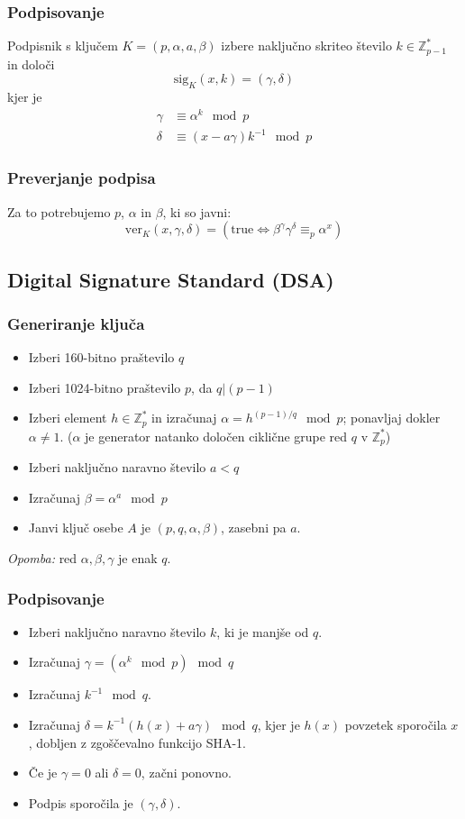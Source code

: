 \begin{multicols}{5}
\subsubsection*{Podpisovanje}
Podpisnik s ključem $K = (p, \alpha, a, \beta)$ izbere naključno skriteo število $k \in \mathbb{Z}_{p-1}^*$ in določi
\[ \text{sig}_K(x, k) = (\gamma, \delta)\]
kjer je
\begin{align*}
	\gamma &\equiv \alpha^k \mod p \\
	\delta &\equiv (x - a\gamma) k^{-1} \mod p
\end{align*}

\subsubsection*{Preverjanje podpisa}
Za to potrebujemo $p$, $\alpha$ in $\beta$, ki so javni:
\[ \text{ver}_K(x, \gamma, \delta) = \left( \text{true} \iff \beta^\gamma \gamma^\delta \equiv_p \alpha^x \right)\]

\subsection*{Digital Signature Standard (DSA)}
\subsubsection*{Generiranje ključa}
\begin{itemize}
	\item Izberi 160-bitno praštevilo $q$
	\item Izberi 1024-bitno praštevilo $p$, da $q|(p-1)$
	\item Izberi element $h \in \mathbb{Z}_p^*$ in izračunaj $\alpha = h^{(p-1)/q} \mod p$; ponavljaj dokler $\alpha \neq 1$. ($\alpha$ je generator natanko določen ciklične grupe red $q$ v $\mathbb{Z}_p^*$)
	\item Izberi naključno naravno število $a < q$
	\item Izračunaj $\beta = \alpha^a \mod p$
	\item Janvi ključ osebe $A$ je $(p, q, \alpha, \beta)$, zasebni pa $a$.
\end{itemize}
\textit{Opomba:} red $\alpha, \beta, \gamma$ je enak $q$.

\subsubsection*{Podpisovanje}
\begin{itemize}
	\item Izberi naključno naravno število $k$, ki je manjše od $q$.
	\item Izračunaj $\gamma = \left( \alpha^k \mod p\right) \mod q$
	\item Izračunaj $k^{-1} \mod q$.
	\item Izračunaj $\delta = k^{-1}(h(x) + a\gamma) \mod q$, kjer je $h(x)$ povzetek sporočila $x$, dobljen z zgoščevalno funkcijo SHA-1.
	\item Če je $\gamma = 0$ ali $\delta = 0$, začni ponovno.
	\item Podpis sporočila je $(\gamma, \delta)$.
\end{itemize}


\end{multicols}
